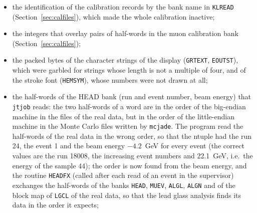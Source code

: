 \begin{itemize}
\item the identification of the calibration records by the bank name in \texttt{KLREAD} (Section~\ref{sec:calfiles}), which made the whole calibration inactive;
\item the integers that overlay pairs of half-words in the muon calibration bank (Section~\ref{sec:calfiles});
\item the packed bytes of the character strings of the display (\texttt{GRTEXT}, \texttt{EOUTST}), which were garbled for strings whose length is not a multiple of four,
and of the stroke font (\texttt{HEMSYM}), whose numbers were not drawn at all;
\item the half-words of the HEAD bank (run and event number, beam energy) that \texttt{jtjob} reads: the two half-words of a word are in the order of the big-endian machine in the files of the real data, but in the order of the little-endian machine in the Monte Carlo files written by \texttt{mcjade}. The program read the half-words of the real data in the wrong order, so that the ntuple had the run 24, the event 1 and the beam energy $-4.2$~GeV for every event (the correct values are the run 18008, the increasing event numbers and 22.1~GeV, i.e.\ the energy of the sample 44); the order is now found from the beam energy, and the routine \texttt{HEADFX} (called after each read of an event in the supervisor) exchanges the half-words of the banks \texttt{HEAD}, \texttt{MUEV}, \texttt{ALGL}, \texttt{ALGN} and of the block map of \texttt{LGCL} of the real data, so that the lead glass analysis finds its data in the order it expects;
\end{itemize}


